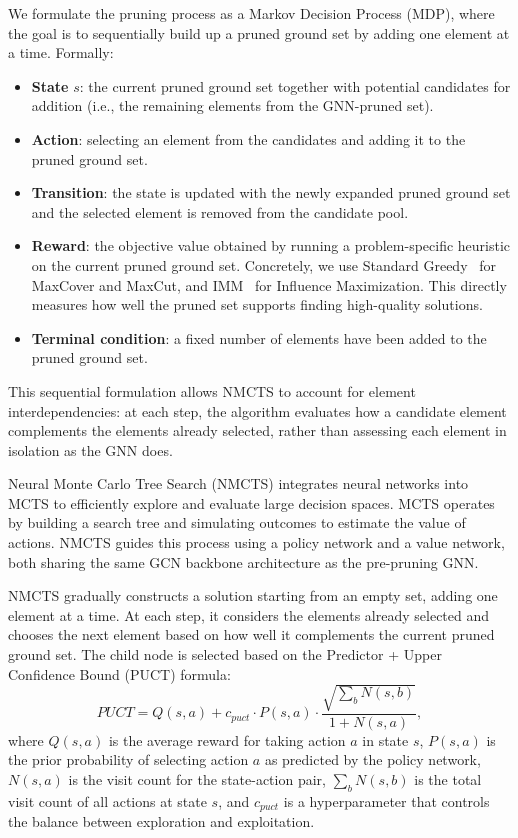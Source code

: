 We formulate the pruning process as a Markov Decision Process (MDP), where the goal is
to sequentially build up a pruned ground set by adding one element at a time. Formally:
\begin{itemize}
  \item \textbf{State} $s$: the current pruned ground set together with potential
    candidates for addition (i.e., the remaining elements from the GNN-pruned set).
  \item \textbf{Action}: selecting an element from the candidates and adding it to the
    pruned ground set.
  \item \textbf{Transition}: the state is updated with the newly expanded pruned ground
    set and the selected element is removed from the candidate pool.
  \item \textbf{Reward}: the objective value obtained by running a problem-specific
    heuristic on the current pruned ground set. Concretely, we use Standard
    Greedy~\citep{nemhauser1978analysis} for MaxCover and MaxCut, and
    IMM~\citep{tang2015influence} for Influence Maximization. This directly measures how
    well the pruned set supports finding high-quality solutions.
  \item \textbf{Terminal condition}: a fixed number of elements have been added to the
    pruned ground set.
\end{itemize}
This sequential formulation allows NMCTS to account for element interdependencies: at each
step, the algorithm evaluates how a candidate element complements the elements already
selected, rather than assessing each element in isolation as the GNN does.

Neural Monte Carlo Tree Search (NMCTS) integrates neural networks into MCTS to
efficiently explore and evaluate large decision spaces. MCTS operates by building a
search tree and simulating outcomes to estimate the value of actions. NMCTS guides this
process using a policy network and a value network, both sharing the same GCN backbone
architecture as the pre-pruning GNN.

NMCTS gradually constructs a solution starting from an empty set, adding one element at
a time. At each step, it considers the elements already selected and chooses the next
element based on how well it complements the current pruned ground set.
The child node is selected based on the Predictor + Upper Confidence Bound (PUCT)
formula:
\[
PUCT = Q(s,a) + c_{puct} \cdot P(s,a) \cdot
\frac{\sqrt{\sum_b N(s,b)}}{1 + N(s,a)},
\]
where $Q(s,a)$ is the average reward for taking action $a$ in state $s$, $P(s,a)$ is the
prior probability of selecting action $a$ as predicted by the policy network, $N(s,a)$ is
the visit count for the state-action pair, $\sum_b N(s,b)$ is the total visit count of
all actions at state $s$, and $c_{puct}$ is a hyperparameter that controls the balance
between exploration and exploitation.

